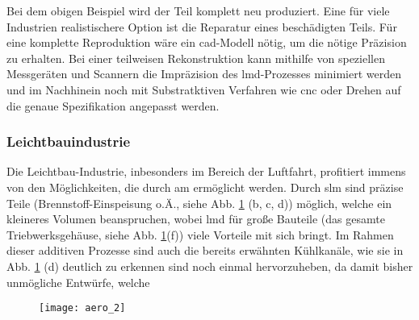 \documentclass[../main.tex]{subfiles}
\begin{document}
Bei dem obigen Beispiel wird der Teil komplett neu produziert. 
Eine für viele Industrien realistischere Option ist die Reparatur eines beschädigten Teils. Für eine komplette Reproduktion wäre ein \acrshort{cad}-Modell nötig, um die nötige Präzision zu erhalten. 
Bei einer teilweisen Rekonstruktion kann mithilfe von speziellen Messgeräten und Scannern die Impräzision des \acrshort{lmd}-Prozesses minimiert werden und im Nachhinein noch mit Substratktiven Verfahren wie \acrfull{cnc} oder Drehen auf die genaue Spezifikation angepasst werden. 
\subsubsection{Leichtbauindustrie}
Die Leichtbau-Industrie, inbesonders im Bereich der Luftfahrt, profitiert immens von den Möglichkeiten, die durch \acrfull{am} ermöglicht werden. Durch \acrfull{slm} sind präzise Teile (Brennstoff-Einspeisung o.Ä., siehe Abb. \ref{img:aero_1} (b, c, d)) möglich, welche ein kleineres Volumen beanspruchen, wobei \acrfull{lmd} für große Bauteile (das gesamte Triebwerksgehäuse, siehe Abb. \ref{img:aero_1}(f)) viele Vorteile mit sich bringt. Im Rahmen dieser additiven Prozesse sind auch die bereits erwähnten Kühlkanäle, wie sie in Abb. \ref{img:aero_1} (d) deutlich zu erkennen sind noch einmal hervorzuheben, da damit bisher unmögliche Entwürfe, welche 

\begin{figure}[H]
	\centering
	\texttt{[image: aero\_2]}
	\label{img:aero_1}
\end{figure} 

\end{document}

